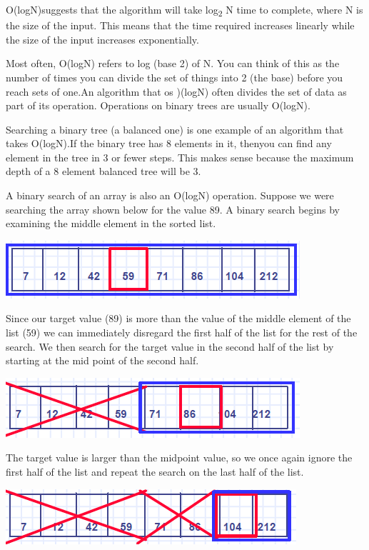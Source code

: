 O(logN)suggests that the algorithm will take
log\textsubscript{2} N time to complete, where N is the size of the
input. This means that the time required increases linearly while the
size of the input increases exponentially.

Most often, O(logN) refers to log (base 2) of N. You can think of this
as the number of times you can divide the set of things into 2 (the
base) before you reach sets of one.An algorithm that os )(logN) often
divides the set of data as part of its operation.   Operations on binary trees are usually O(logN).

Searching a binary tree (a balanced one) is one example of an algorithm
that takes O(logN).If the binary tree has 8 elements in it, thenyou can find any element in the tree in 3 or fewer steps. This
makes sense because the maximum depth of a 8 element balanced tree will
be 3.

A binary search of an array is also an O(logN) operation.  Suppose we were searching the array shown below for the value 89.  A binary search begins by examining the middle element in the sorted list.

\includegraphics{pictures/binarySearch1.png}

Since our target value (89) is more than the value of the middle element of the list (59) we can immediately disregard the first half of the list  for the rest of the search.   We then search for the target value in the second half of the list by starting at the mid point of the second half.

\includegraphics{pictures/binarySearch2.png}


The target value is larger than the midpoint value, so we once again ignore the first half of the list and repeat the search on the last half of the list.

\includegraphics{pictures/binarySearch3.png}

